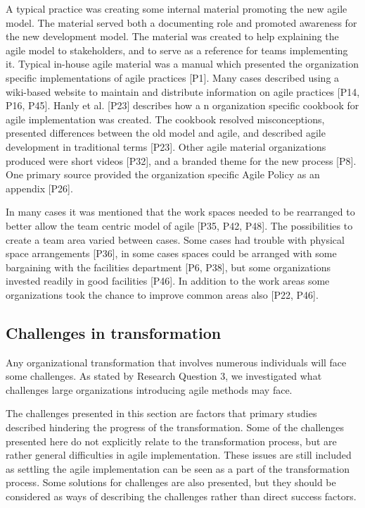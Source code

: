 \documentclass[preprint,authoryear,12pt]{elsarticle}
\begin{document}

A typical practice was creating some internal material promoting the new agile
model. The material served both a documenting role and promoted awareness for
the new development model. The material was created to help explaining the agile
model to stakeholders, and to serve as a reference for teams implementing it.
Typical in-house agile material was a manual which presented the organization
specific implementations of agile practices [P1]. Many cases described using a
wiki-based website to maintain and distribute information on agile practices
[P14, P16, P45]. Hanly et al. [P23] describes how a n organization specific
cookbook for agile implementation was created. The cookbook resolved
misconceptions, presented differences between the old model and agile, and
described agile development in traditional terms [P23]. Other agile material
organizations produced were short videos [P32], and a branded theme for the new
process [P8]. One primary source provided the organization specific Agile Policy
as an appendix [P26].


In many cases it was mentioned that the work spaces needed to be rearranged to
better allow the team centric model of agile [P35, P42, P48]. The possibilities
to create a team area varied between cases. Some cases had trouble with physical
space arrangements [P36], in some cases spaces could be arranged with some
bargaining with the facilities department [P6, P38], but some organizations
invested readily in good facilities [P46]. In addition to the work areas some
organizations took the chance to improve common areas also [P22, P46].


\clearpage

\subsection{Challenges in transformation}

Any organizational transformation that involves numerous individuals will face
some challenges. As stated by Research Question 3, we investigated what
challenges large organizations introducing agile methods may face.

The challenges presented in this section are factors that primary studies
described hindering the progress of the transformation. Some of the challenges
presented here do not explicitly relate to the transformation process, but are
rather general difficulties in agile implementation. These issues are still
included as settling the agile implementation can be seen as a part of the
transformation process. Some solutions for challenges are also presented, but
they should be considered as ways of describing the challenges rather than
direct success factors.
\end{document}
